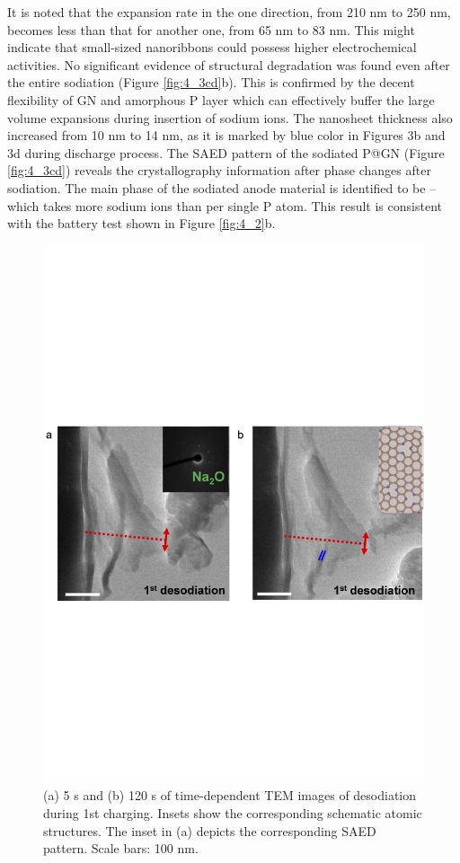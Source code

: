 It is noted that the expansion rate in the one direction, from 210 nm to 250 nm, becomes less than that for another one, from 65 nm to 83 nm. This might indicate that small-sized nanoribbons could possess higher electrochemical activities. 
No significant evidence of structural degradation was found even after the entire sodiation (Figure \ref{fig:4_3cd}b). This is confirmed by the decent flexibility of GN and amorphous P layer which can effectively buffer the large volume expansions during insertion of sodium ions. 
The nanosheet thickness also increased from 10 nm to 14 nm, as it is marked by blue color in Figures 3b and 3d during discharge process. 
The SAED pattern of the sodiated P@GN (Figure \ref{fig:4_3cd}) reveals the crystallography information after phase changes after sodiation. 
The main phase of the sodiated anode material is identified to be  -- which takes more sodium ions than  per single P atom. This result is consistent with the battery test shown in Figure \ref{fig:4_2}b. 

\begin{figure}  
\includegraphics[width=\textwidth,angle=0]{figures/figure4_3ef}
\caption[{\it In situ} desodiation process on P@GN SIB]
{
  (a) 5 s and (b) 120 s of time-dependent TEM images of desodiation during 1st charging. Insets show the corresponding schematic atomic structures. The inset in (a) depicts the corresponding SAED pattern. Scale bars: 100 nm.
\label{fig:4_3ef}}
\end{figure}

